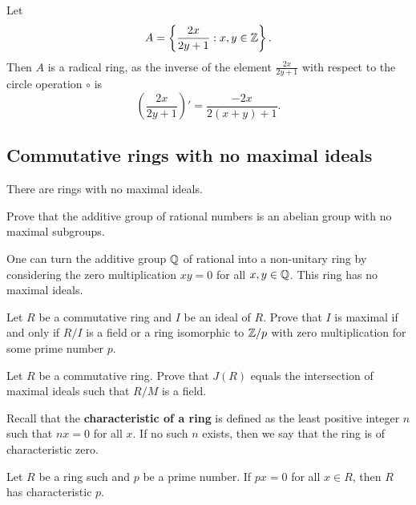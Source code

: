 \begin{example}
	Let 
	\[
	A=\left\{\frac{2x}{2y+1}:x,y\in\mathbb{Z}\right\}.
	\]
	Then $A$ is a radical ring, as the inverse of the element $\frac{2x}{2y+1}$
	with respect to the circle operation 
	$\circ$ is 
	\[
	\left(\frac{2x}{2y+1}\right)'=\frac{-2x}{2(x+y)+1}.
	\]
\end{example}

\subsection{Commutative rings with no maximal ideals}

There are rings with no maximal ideals. 

\begin{exercise}
\label{xca:Q_no_maximals}
    Prove that the additive group of rational numbers is an abelian group
with no maximal subgroups.
\end{exercise}

One can turn the additive group $\mathbb{Q}$ of rational into a non-unitary 
ring by considering the zero multiplication $xy=0$ for all $x,y\in\mathbb{Q}$. This 
ring has no maximal ideals. 


\begin{exercise}
\label{xca:R/I_field_or_zero}
    Let $R$ be a commutative ring 
    and $I$ be an ideal of $R$. Prove that
    $I$ is maximal if and only if $R/I$ is a field
    or a ring isomorphic to 
    $\mathbb{Z}/p$ with zero multiplication for some prime number $p$. 
\end{exercise}

\begin{exercise}
    \label{xca:J(R)_fields}
    Let $R$ be a commutative ring. Prove that
    $J(R)$ equals the intersection of maximal ideals 
    such that $R/M$ is a field. 
\end{exercise}

Recall that the \textbf{characteristic of a ring} is defined as the least positive
integer $n$ such that $nx=0$ for all $x$. If no such $n$ exists, 
then we say that the ring is of characteristic zero. 

\begin{exercise}
\label{xca:characteristic}
    Let $R$ be a ring such and $p$ be a prime number. 
    If $px=0$ for all $x\in R$, then $R$ has characteristic $p$. 
\end{exercise}

